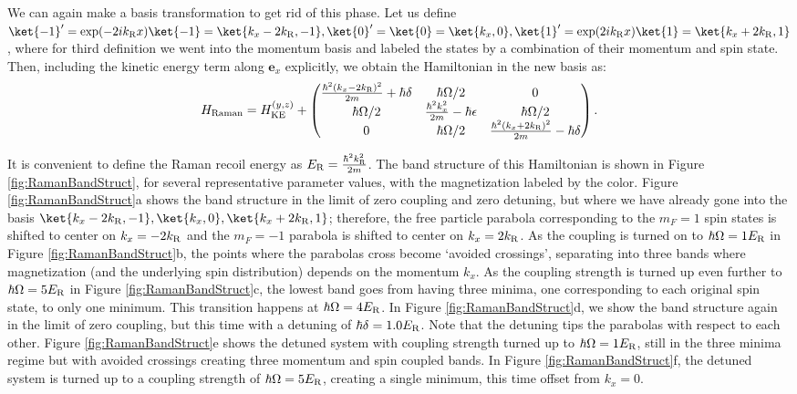 	We can again make a basis transformation to get rid of this phase. Let us define  $\ket{-1}' = {\rm exp}(-2ik_{\rm R} x)\ket{-1} = \ket{k_x-2k_{\rm R},-1},\ket{0}' = \ket{0} = \ket{k_x,0},\ket{1}' = {\rm exp}(2ik_{\rm R} x)\ket{1}=\ket{k_x+2k_{\rm R},1}$, where for third definition we went into the momentum basis and labeled the states by a combination of their momentum and spin state. Then, including the kinetic energy term along $\mathbf{e}_x$ explicitly, we obtain the Hamiltonian in the new basis as:
 \begin{equation}
H_{\rm Raman} = H_{\rm KE}^{(y,z)} +
 \begin{pmatrix} \frac{\hbar^2(k_x-2k_{\rm R})^2}{2m}+\hbar\delta & \hbar\Omega/2  &  0  \\ 
\hbar\Omega/2 & \frac{\hbar^2 k_x^2}{2m} - \hbar\epsilon &  \hbar\Omega/2\\
 0 & \hbar\Omega/2 &  \frac{\hbar^2(k_x+2k_{\rm R})^2}{2m} -\hbar\delta  \\
 \end{pmatrix} \\.
\label{eqn:RamanHam}
\end{equation}

It is convenient to define the Raman recoil energy as $E_{\rm R} = \frac{\hbar^2 k_{\rm R}^2}{2m}$. The band structure of this Hamiltonian is shown in Figure \ref{fig:RamanBandStruct}, for several representative parameter values, with the magnetization labeled by the color. Figure \ref{fig:RamanBandStruct}a shows the band structure in the limit of zero coupling and zero detuning, but where we have already gone into the basis $ \ket{k_x-2k_{\rm R},-1}, \ket{k_x,0},\ket{k_x+2k_{\rm R},1}$; therefore, the free particle parabola corresponding to the $m_F=1$ spin states is shifted to center on $k_x=-2k_{\rm R}$ and the $m_F=-1$ parabola is shifted to center on $k_x = 2k_{\rm R}$. As the coupling is turned on to $\hbar\Omega = 1 E_{\rm R}$ in Figure \ref{fig:RamanBandStruct}b, the points where the parabolas cross become \lq{avoided crossings}\rq{}, separating into three bands where magnetization (and the underlying spin distribution) depends on the momentum $k_x$. As the coupling strength is turned up even further to $\hbar\Omega = 5 E_{\rm R}$ in Figure \ref{fig:RamanBandStruct}c, the lowest band goes from having three minima, one corresponding to each original spin state, to only one minimum. This transition happens at $\hbar\Omega = 4 E_{\rm R}$\cite{KarinaThesis}. In Figure \ref{fig:RamanBandStruct}d, we show the band structure again in the limit of zero coupling, but this time with a detuning of $\hbar\delta = 1.0 E_{\rm R}$. Note that the detuning tips the parabolas with respect to each other. Figure \ref{fig:RamanBandStruct}e shows the detuned system with coupling strength turned up to $\hbar\Omega = 1 E_{\rm R}$, still in the three minima regime but with avoided crossings creating three momentum and spin coupled bands. In Figure \ref{fig:RamanBandStruct}f, the detuned system is turned up to a coupling strength of $\hbar\Omega = 5E_{\rm R}$, creating a single minimum, this time offset from $k_x = 0$.

